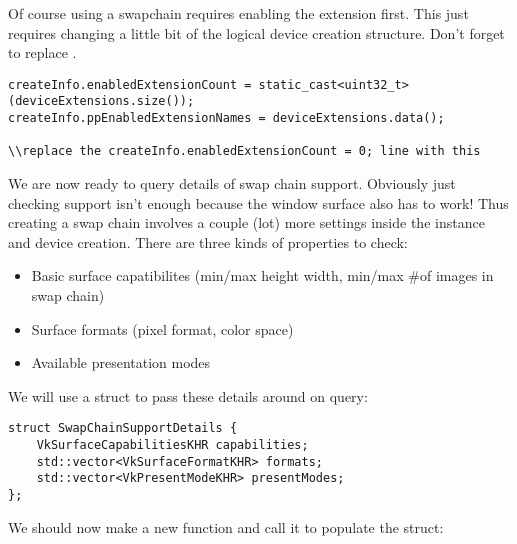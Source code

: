 \par Of course using a swapchain requires enabling the  extension first. This just requires changing a little bit of the logical device creation structure. Don't forget to replace .

\begin{center}
\begin{minipage}{0.95\linewidth}
\begin{lstlisting}
createInfo.enabledExtensionCount = static_cast<uint32_t>(deviceExtensions.size());
createInfo.ppEnabledExtensionNames = deviceExtensions.data();

\\replace the createInfo.enabledExtensionCount = 0; line with this
\end{lstlisting}
\end{minipage}
\end{center}

\par We are now ready to query details of swap chain support. Obviously just checking support isn't enough because the window surface also has to work! Thus creating a swap chain involves a couple (lot) more settings inside the instance and device creation. There are three kinds of properties to check:
\begin{itemize}
\item Basic surface capatibilites (min/max height width, min/max \#of images in swap chain)
\item Surface formats (pixel format, color space)
\item Available presentation modes
\end{itemize}

\par We will use a struct to pass these details around on query:

\begin{center}
\begin{minipage}{0.95\linewidth}
\begin{lstlisting}
struct SwapChainSupportDetails {
    VkSurfaceCapabilitiesKHR capabilities;
    std::vector<VkSurfaceFormatKHR> formats;
    std::vector<VkPresentModeKHR> presentModes;
};
\end{lstlisting}
\end{minipage}
\end{center}

\par We should now make a new function and call it  to populate the struct:

